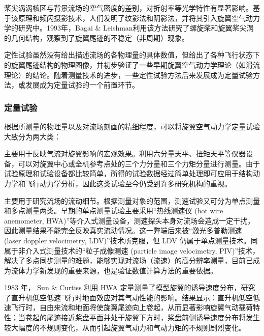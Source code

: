桨尖涡涡核区与背景流场的空气密度的差别，对折射率等光学特性有显著影响。基于该原理和频闪摄影技术，人们发明了纹影法和阴影法，并将其引入旋翼空气动力学的研究中。1993年，Bagai
\& Leishman利用该方法研究了螺旋桨和旋翼桨尖涡的几何结构，观察到了旋翼尾迹的不稳定（非周期）现象。

定性试验虽然没有给出描述流场的各物理量的具体数值，但给出了各种飞行状态下的旋翼尾迹结构的物理图像，并初步验证了一些早期旋翼空气动力学理论（如滑流理论）的结论。随着测量技术的进步，一些定性试验方法后来发展成为定量试验方法，或发展成为定量试验的一个前置环节。

\subsubsection{定量试验}

根据所测量的物理量以及对流场刻画的精细程度，可以将旋翼空气动力学定量试验大致分为两大类：
\begin{description}[wide]
\item [{测力试验}] 主要用于反映气流对旋翼影响的宏观效果。利用六分量天平、扭矩天平等仪器设备，可以对旋翼中心或全机参考点处的三个力分量和三个力矩分量进行测量。由于试验原理和试验设备都比较简单，所得的试验数据经过简单处理即可应用于结构动力学和飞行动力学分析，因此这类试验至今仍受到许多研究机构的重视。
\item [{测速试验}] 主要用于研究流场的流动细节。根据测量对象的范围，测速试验又可分为单点测量和多点测量两类。早期的单点测量试验主要采用“热线测速仪
(hot wire anemometer, HWA)”等介入式测量设备，测速探头本身对流场会造成一定干扰，因此测量结果不能完全反映真实流动情况。这一弊端后来被“激光多普勒测速
(laser doppler velocimetry, LDV)”技术所克服，但
LDV 仍属于单点测量技术。同属于非介入式测量技术的“粒子成像测速 (particle image velocimetry, PIV)”技术，解决了多点同步测量的难题，能够实现对流场（流速）的高分辨率测量，目前已成为流体力学新发现的重要来源，也是验证数值计算方法的重要依据。
\end{description}
%
1983 年， Sun \& Curtiss 利用 HWA 定量测量了模型旋翼的诱导速度分布，研究了直升机低空低速飞行时地面效应对其气动性能的影响。结果显示：直升机低空低速飞行时，自由来流和地面将使旋翼尾迹向上卷起，从而显著影响旋翼气动载荷特性；当卷起的尾迹接近桨盘平面并处于旋翼下方时，桨盘前侧诱导速度分布将发生较大幅度的不规则变化，从而引起旋翼气动力和气动力矩的不规则剧烈变化。

